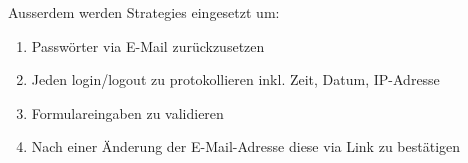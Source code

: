 Ausserdem werden Strategies eingesetzt um:
\begin{enumerate}
  \item Passwörter via E-Mail zurückzusetzen
  \item Jeden login/logout zu protokollieren inkl. Zeit, Datum, IP-Adresse
  \item Formulareingaben zu validieren
  \item Nach einer Änderung der E-Mail-Adresse diese via Link zu bestätigen
\end{enumerate}

